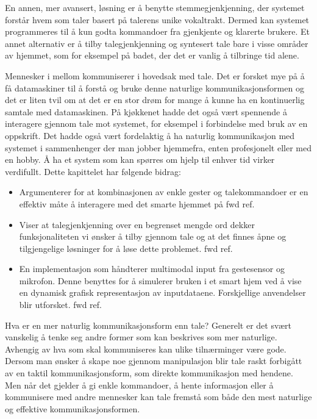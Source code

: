 En annen, mer avansert, løsning er å benytte stemmegjenkjenning, der systemet forstår hvem som taler basert på talerens unike vokaltrakt. Dermed kan systemet programmeres til å kun godta kommandoer fra gjenkjente og klarerte brukere. Et annet alternativ er å tilby talegjenkjenning og syntesert tale bare i visse områder av hjemmet, som for eksempel på badet, der det er vanlig å tilbringe tid alene.

Mennesker i mellom kommuniserer i hovedsak med tale. Det er forsket mye på å få datamaskiner til å forstå og bruke denne naturlige kommunikasjonsformen og det er liten tvil om at det er en stor drøm for mange å kunne ha en kontinuerlig samtale med datamaskinen. 
På kjøkkenet hadde det også vært spennende å interagere gjennom tale mot systemet, for eksempel i forbindelse med bruk av en oppskrift. Det hadde også vært fordelaktig å ha naturlig kommunikasjon med systemet i sammenhenger der man jobber hjemmefra, enten profesjonelt eller med en hobby. Å ha et system som kan spørres om hjelp til enhver tid virker verdifullt.
Dette kapittelet har følgende bidrag:
\begin{itemize}
\item Argumenterer for at kombinasjonen av enkle gester og talekommandoer er en effektiv måte å interagere med det smarte hjemmet på {\color{red} fwd ref}.
\item Viser at talegjenkjenning over en begrenset mengde ord dekker funksjonaliteten vi ønsker å tilby gjennom tale og at det finnes åpne og tilgjengelige løsninger for å løse dette problemet.{\color{red} fwd ref}.
\item En implementasjon som håndterer multimodal input fra gestesensor og mikrofon. Denne benyttes for å simulerer bruken i et smart hjem ved å vise en dynamisk grafisk representasjon av inputdataene. Forskjellige anvendelser blir utforsket. {\color{red} fwd ref}.
\end{itemize}

Hva er en mer naturlig kommunikasjonsform enn tale? Generelt er det svært vanskelig å tenke seg andre former som kan beskrives som mer naturlige. Avhengig av hva som skal kommuniseres kan ulike tilnærminger være gode. Dersom man ønsker å skape noe gjennom manipulasjon blir tale raskt forbigått av en taktil kommunikasjonsform, som direkte kommunikasjon med hendene. Men når det gjelder å gi enkle kommandoer, å hente informasjon eller å kommunisere med andre mennesker kan tale fremstå som både den mest naturlige og effektive kommunikasjonsformen.

